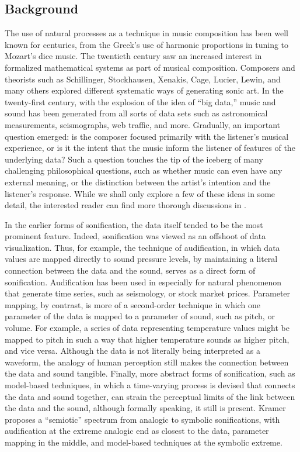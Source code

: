 \subsection{Background}
\label{sec:background}
The use of natural processes as a technique in music composition has been well known for centuries, from the Greek's use of harmonic proportions in tuning to Mozart's dice music. The twentieth century saw an increased interest in formalized mathematical systems as part of musical composition. Composers and theorists such as Schillinger, Stockhausen, Xenakis, Cage, Lucier, Lewin, and many others explored different systematic ways of generating sonic art. In the twenty-first century, with the explosion of the idea of ``big data,'' music and sound has been generated from all sorts of data sets such as astronomical measurements, seismographs, web traffic, and more. Gradually, an important question emerged: is the composer focused primarily with the listener's musical experience, or is it the intent that the music inform the listener of features of the underlying data? Such a question touches the tip of the iceberg of many challenging philosophical questions, such as whether music can even have any external meaning, or the distinction between the artist's intention and the listener's response. While we shall only explore a few of these ideas in some detail, the interested reader can find more thorough discussions in .

In the earlier forms of sonification, the data itself tended to be the most prominent feature. Indeed, sonification was viewed as an offshoot of data visualization. Thus, for example, the technique of audification, in which data values are mapped directly to sound pressure levels, by maintaining a literal connection between the data and the sound, serves as a direct form of sonification. Audification has been used in especially for natural phenomenon that generate time series, such as seismology, or stock market prices. Parameter mapping, by contrast, is more of a second-order technique in which one parameter of the data is mapped to a parameter of sound, such as pitch, or volume. For example, a series of data representing temperature values might be mapped to pitch in such a way that higher temperature sounds as higher pitch, and vice versa. Although the data is not literally being interpreted as a waveform, the analogy of human perception still makes the connection between the data and sound tangible. Finally, more abstract forms of sonification, such as model-based techniques, in which a time-varying process is devised that connects the data and sound together, can strain the perceptual limits of the link between the data and the sound, although formally speaking, it still is present. Kramer proposes a ``semiotic'' spectrum from analogic to symbolic sonifications, with audification at the extreme analogic end as closest to the data, parameter mapping in the middle, and model-based techniques at the symbolic extreme.

